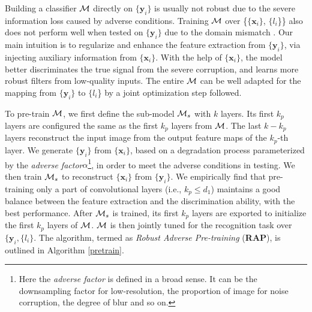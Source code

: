 \documentclass[10pt,twocolumn,twoside]{IEEEtran} %
\begin{document}
Building a classifier ${\mathcal{M}}$ directly on $\{\mathbf{y}_i\}$ is usually not robust due to the severe information loss  caused by adverse conditions. Training ${\mathcal{M}}$ over \{$\{\mathbf{x}_i\}$, $\{l_i$\}\} also does not perform well when tested on $\{\mathbf{y}_i\}$ due to the domain mismatch \cite{vlrr, VFR}. Our main intuition is to regularize and enhance the feature extraction from $\{\mathbf{y}_i\}$, via injecting auxiliary information from $\{\mathbf{x}_i\}$. With the help of $\{\mathbf{x}_i\}$, the model better discriminates the true signal from the severe corruption, and learns more robust filters from low-quality inputs. The entire ${\mathcal{M}}$ can be well adapted for the mapping from $\{\mathbf{y}_i\}$ to $\{l_i$\} by a joint optimization step followed.

To pre-train ${\mathcal{M}}$, we first define the sub-model ${\mathcal{M}}_s$ with $k$ layers. Its first $k_p$ layers are configured the same as the first $k_p$ layers from ${\mathcal{M}}$. The last $k - k_p$ layers reconstruct the input image from the output feature maps of the $k_p$-th layer. 
We generate $\{\mathbf{y}_i\}$ from $\{\mathbf{x}_i\}$, based on a degradation process parameterized by the \textit{adverse factor}$\alpha$\footnote{Here the \textit{adverse factor} is defined in a broad sense. It can be the downsampling factor for low-resolution, the proportion of image for noise corruption, the degree of blur and so on.}, in order to meet the adverse conditions in testing. 
We then train ${\mathcal{M}}_s$ to reconstruct $\{\mathbf{x}_i\}$ from $\{\mathbf{y}_i\}$. 
We empirically find that pre-training only a part of convolutional layers (i.e., $k_p \leq d_1$) maintains a good balance between the feature extraction and the discrimination ability, with the best performance. After ${\mathcal{M}}_s$ is trained, its first $k_p$ layers are exported to initialize the first $k_p$ layers of ${\mathcal{M}}$. ${\mathcal{M}}$ is then jointly tuned for the recognition task over $\{\mathbf{y}_i, \{l_i\}$. The algorithm, termed as \textit{Robust Adverse Pre-training} (\textbf{RAP}), is outlined in Algorithm \ref{pretrain}.
\end{document}
